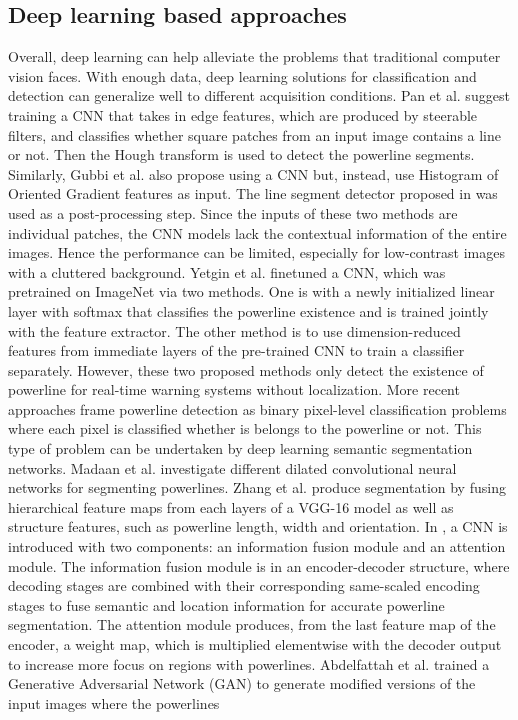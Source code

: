 \documentclass[journal]{IEEEtran}
\begin{document}
\subsection{Deep learning based approaches}
Overall, deep learning can help alleviate the problems that traditional computer vision faces. With enough data, deep learning solutions for classification and detection can generalize well to different acquisition conditions. Pan et al. \cite{related_work_chaofeng_pan_2016} suggest training a CNN that takes in edge features, which are produced by steerable filters, and classifies whether square patches from an input image contains a line or not. Then the Hough transform is used to detect the powerline segments. Similarly, Gubbi et al. \cite{related_work_jayavardhana_gubbi} also propose using a CNN but, instead, use Histogram of Oriented Gradient features as input. The line segment detector proposed in \cite{lsd} was used as a post-processing step. Since the inputs of these two methods are individual patches, the CNN models lack the contextual information of the entire images. Hence the performance can be limited, especially for low-contrast images with a cluttered background. Yetgin et al. \cite{related_work_omer_emre_yetgin_2018} finetuned a CNN, which was pretrained on ImageNet \cite{deng2009imagenet} via two methods. One is with a newly initialized linear layer with softmax that classifies the powerline existence and is trained jointly with the feature extractor. The other method is to use dimension-reduced features from immediate layers of the pre-trained CNN to train a classifier separately. However, these two proposed methods only detect the existence of powerline for real-time warning systems without localization. More recent approaches \cite{related_work_rainesh_mandaan_2017,related_work_heng_zhang_2019,related_work_yan_li_2019,related_work_rabab_abdelfattah_2022,related_work_rabeea_haffari_2021} frame powerline detection as binary pixel-level classification problems where each pixel is classified whether is belongs to the powerline or not. This type of problem can be undertaken by deep learning semantic segmentation networks. Madaan et al. \cite{related_work_rainesh_mandaan_2017} investigate different dilated convolutional neural networks for segmenting powerlines. Zhang et al. \cite{related_work_heng_zhang_2019} produce segmentation by fusing hierarchical feature maps from each layers of a VGG-16 model \cite{vgg} as well as structure features, such as powerline length, width and orientation. In \cite{related_work_yan_li_2019}, a CNN is introduced with two components: an information fusion module and an attention module. The information fusion module is in an encoder-decoder structure, where decoding stages are combined with their corresponding same-scaled encoding stages to fuse semantic and location information for accurate powerline segmentation. The attention module produces, from the last feature map of the encoder, a weight map, which is multiplied elementwise with the decoder output to increase more focus on regions with powerlines. Abdelfattah et al. \cite{related_work_rabab_abdelfattah_2022} trained a Generative Adversarial Network (GAN) to generate modified versions of the input images where the powerlines 
\end{document}
